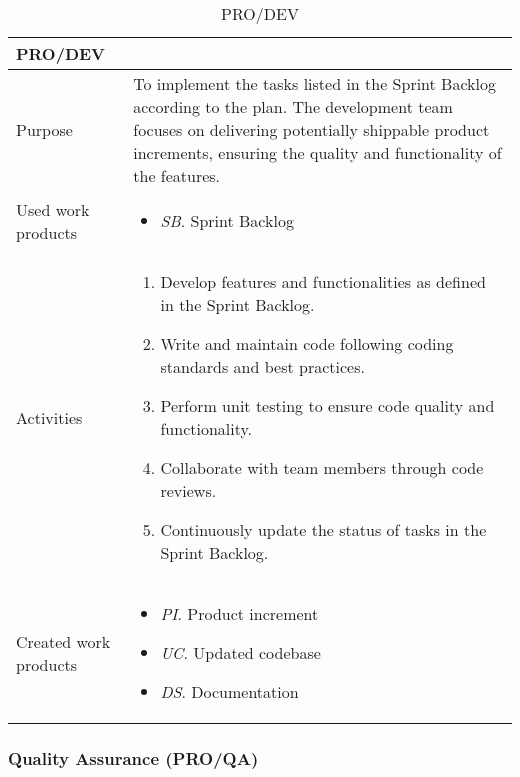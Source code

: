 \begin{table}[h!]
\begin{tabular}{l|p{}}
\hline
\textbf{PRO/DEV}        & \textbf{} \\ \hline
Purpose & To implement the tasks listed in the Sprint Backlog according to the plan. The development team focuses on delivering potentially shippable product increments, ensuring the quality and functionality of the features. \\ \hline
Used work products    &      
\begin{itemize}
    \item \textit{SB}. Sprint Backlog
\end{itemize}
\\ \hline
Activities            &   
\begin{enumerate}
    \item Develop features and functionalities as defined in the Sprint Backlog.
    \item Write and maintain code following coding standards and best practices.
    \item Perform unit testing to ensure code quality and functionality.
    \item Collaborate with team members through code reviews.
    \item Continuously update the status of tasks in the Sprint Backlog.
\end{enumerate}
\\ \hline
Created work products &     
\begin{itemize}
    \item \textit{PI}. Product increment 
    \item \textit{UC}. Updated codebase
    \item \textit{DS}. Documentation 
\end{itemize}
\end{tabular}
\caption{PRO/DEV}
\label{development_process}
\end{table}

\newpage
\subsubsection{Quality Assurance (PRO/QA)}

